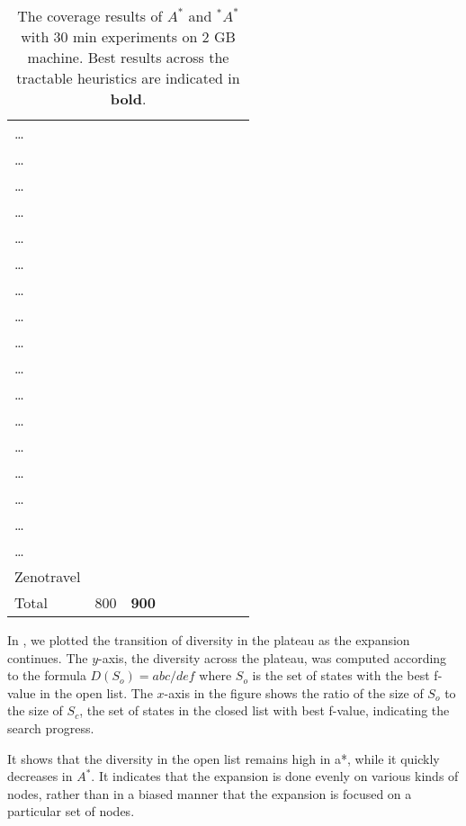 {\begin{table}[htb]
\begin{tabular}{l|ll|ll||ll|ll|}
\ldots{} &  &  &  &  &  &  &  & \\
\ldots{} &  &  &  &  &  &  &  & \\
\ldots{} &  &  &  &  &  &  &  & \\
\ldots{} &  &  &  &  &  &  &  & \\
\ldots{} &  &  &  &  &  &  &  & \\
\ldots{} &  &  &  &  &  &  &  & \\
\ldots{} &  &  &  &  &  &  &  & \\
\ldots{} &  &  &  &  &  &  &  & \\
\ldots{} &  &  &  &  &  &  &  & \\
\ldots{} &  &  &  &  &  &  &  & \\
\ldots{} &  &  &  &  &  &  &  & \\
\ldots{} &  &  &  &  &  &  &  & \\
\ldots{} &  &  &  &  &  &  &  & \\
\ldots{} &  &  &  &  &  &  &  & \\
\ldots{} &  &  &  &  &  &  &  & \\
\ldots{} &  &  &  &  &  &  &  & \\
\ldots{} &  &  &  &  &  &  &  & \\
Zenotravel &  &  &  &  &  &  &  & \\
\hline
Total & 800 & \textbf{900} &  &  &  &  &  & \\
\end{tabular}
\caption{The coverage results of $A^*$ and $^*A^*$ with 30 min experiments on 2 GB machine. Best results across the tractable heuristics are indicated in \textbf{bold}.}
\label{tbl:main}
\end{table}

}

In , we plotted the transition of diversity in the plateau as the expansion continues. The $y$-axis, the diversity across the plateau, was computed according to the formula $D(S_o)=abc/def$ where $S_o$ is the set of states with the best f-value in the open list. The $x$-axis in the figure shows the ratio of the size of $S_o$ to the size of $S_c$, the set of states in the closed list with best f-value, indicating the search progress.

It shows that the diversity in the open list remains high in \*a*, while it quickly decreases in $A^*$. It indicates that the expansion is done evenly on various kinds of nodes, rather than in a biased manner that the expansion is focused on a particular set of nodes. 

